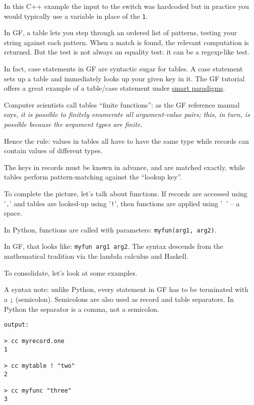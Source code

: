 \documentclass{scrartcl}
\begin{document}
In this C++ example the input to the switch was hardcoded but in practice you would typically use a variable in place of the \texttt{1}.

In GF, a table lets you step through an ordered list of patterns, testing your string against each pattern. When a match is found, the relevant computation is returned. But the test is not always an equality test: it can be a regexp-like test.

In fact, case statements in GF are syntactic sugar for tables. A case statement sets up a table and immediately looks up your given key in it. The GF tutorial offers a great example of a table/case statement under \href{http://www.grammaticalframework.org/doc/tutorial/gf-tutorial.html#toc59}{smart paradigms}.

Computer scientists call tables ``finite functions'': as the GF reference manual says, \textit{it is possible to finitely enumerate all argument-value pairs; this, in turn, is possible because the argument types are finite.}

Hence the rule: values in tables all have to have the same type while records can contain values of different types.

The keys in records must be known in advance, and are matched exactly, while tables perform pattern-matching against the ``lookup key''.

To complete the picture, let's talk about functions. If records are accessed using '\texttt{.}' and tables are looked-up using '\texttt{!}', then functions are applied using '\texttt{ }' -- a space.

In Python, functions are called with parameters: \texttt{myfun(arg1, arg2)}.

In GF, that looks like: \texttt{myfun arg1 arg2}. The syntax descends from the mathematical tradition via the lambda calculus and Haskell.

To consolidate, let's look at some examples.



A syntax note: unlike Python, every statement in GF has to be terminated with a \texttt{;} (semicolon). Semicolons are also used as record and table separators. In Python the separator is a comma, not a semicolon.

\begin{verbatim}
output:

> cc myrecord.one
1

> cc mytable ! "two"
2

> cc myfunc "three"
3
\end{verbatim}
\end{document}
